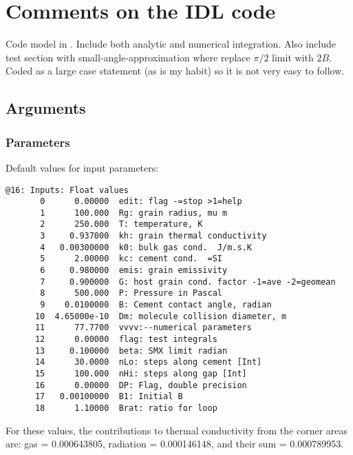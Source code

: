 \documentclass{article}
\begin{document}
\section {Comments on the IDL code \label{sec:code}} %

Code model in . Include both analytic and numerical
integration. Also include test section with small-angle-approximation where
replace $\pi/2$ limit with $2B$. Coded as a large case statement (as is my
habit) so it is not very easy to follow.

\subsection{Arguments} %
\subsubsection{Parameters} %
Default values for input parameters:
\begin{verbatim} 
@16: Inputs: Float values
       0      0.00000  edit: flag -=stop >1=help 
       1      100.000  Rg: grain radius, mu m
       2      250.000  T: temperature, K
       3     0.937000  kh: grain thermal conductivity
       4   0.00300000  k0: bulk gas cond.  J/m.s.K
       5      2.00000  kc: cement cond.  =SI
       6     0.980000  emis: grain emissivity
       7     0.900000  G: host grain cond. factor -1=ave -2=geomean
       8      500.000  P: Pressure in Pascal
       9    0.0100000  B: Cement contact angle, radian
      10  4.65000e-10  Dm: molecule collision diameter, m
      11      77.7700  vvvv:--numerical parameters
      12      0.00000  flag: test integrals
      13     0.100000  beta: SMX limit radian
      14      30.0000  nLo: steps along cement [Int]
      15      100.000  nHi: steps along gap [Int]
      16      0.00000  DP: Flag, double precision
      17   0.00100000  B1: Initial B
      18      1.10000  Brat: ratio for loop
\end{verbatim}
 For these values, the contributions to thermal conductivity from the corner
 areas are: gas = 0.000643805, radiation = 0.000146148, and their sum =
 0.000789953.
\end{document}
